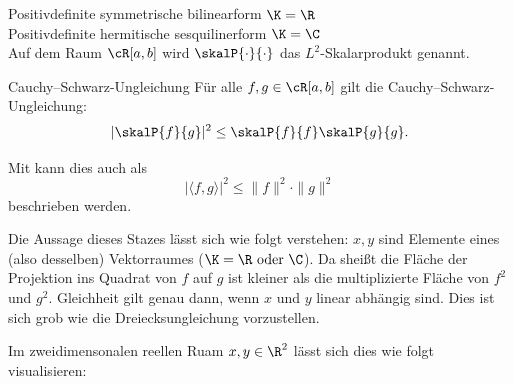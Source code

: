 \begin{bemerkungbox}
    Positivdefinite symmetrische bilinearform $\K = \R$ \\
    Positivdefinite hermitische sesquilinerform $\K = \C$ \\
    Auf dem Raum $\cR[a,b]$ wird $\skalP{\cdot}{\cdot}$ das $L^2$-Skalarprodukt genannt.
\end{bemerkungbox}

\begin{lemma}{Cauchy--Schwarz-Ungleichung}
    Für alle $f,g \in \cR[a,b]$ gilt die Cauchy--Schwarz-Ungleichung:
    $$
        |\skalP{f}{g}|^2 \le \skalP{f}{f}\skalP{g}{g}.
    $$

    Mit  kann dies auch als 
    $$
        \left|\langle f, g\rangle\right|^{2} \leq \|f\|^{2} \cdot \|g\|^{2}
    $$
    beschrieben werden.
\end{lemma}
Die Aussage dieses Stazes lässt sich wie folgt verstehen:
$x,y$ sind Elemente eines (also desselben) Vektorraumes ($\K = \R \text{ oder } \C$). Da sheißt die Fläche der Projektion ins Quadrat von $f$ auf $g$ ist kleiner als die multiplizierte Fläche von $f^2$ und $g^2$.
Gleichheit gilt genau dann, wenn $x$ und $y$ linear abhängig sind.
Dies ist sich grob wie die Dreiecksungleichung vorzustellen. 

\begin{beispielbox}
    Im zweidimensonalen reellen Ruam $x,y \in \R^2$ lässt sich dies wie folgt visualisieren:
\end{beispielbox}

